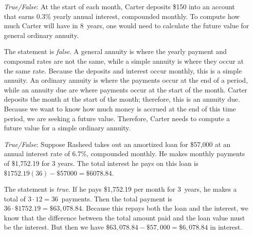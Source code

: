\documentclass[11pt,letterpaper]{article}
\begin{document}
\quizsol \textit{True/False}: At the start of each month, Carter deposits \$150 into an account that earns 0.3\% yearly annual interest, compounded monthly. To compute how much Carter will have in 8~years, one would need to calculate the future value for general ordinary annuity. \pspace

\sol The statement is \textit{false}. A general annuity is where the yearly payment and compound rates are not the same, while a simple annuity is where they occur at the same rate. Because the deposits and interest occur monthly, this is a simple annuity. An ordinary annuity is where the payments occur at the end of a period, while an annuity due are where payments occur at the start of the month. Carter deposits the month at the start of the month; therefore, this is an annuity due. Because we want to know how much money is accrued at the end of this time period, we are seeking a future value. Therefore, Carter needs to compute a future value for a simple ordinary annuity. 





\newpage





\quizsol \textit{True/False}: Suppose Rasheed takes out an amortized loan for \$57,000 at an annual interest rate of 6.7\%, compounded monthly. He makes monthly payments of \$1,752.19 for 3 years. The total interest he pays on this loan is $\$1752.19(36) - \$57000 = \$6078.84$. \pspace

\sol The statement is \textit{true}. If he pays \$1,752.19 per month for 3~years, he makes a total of $3 \cdot 12= 36$~payments. Then the total payment is $36 \cdot \$1752.19= \$63,078.84$. Because this repays both the loan and the interest, we know that the difference between the total amount paid and the loan value must be the interest. But then we have $\$63,078.84 - \$57,000= \$6,078.84$ in interest. \pvspace{1.5cm}






\end{document}
